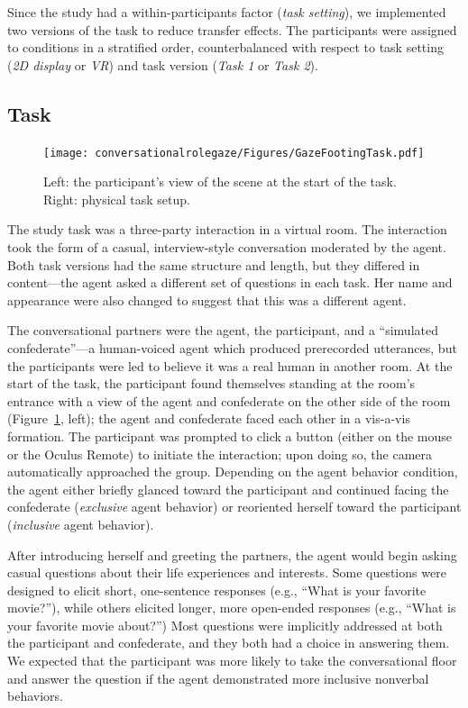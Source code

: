 Since the study had a within-participants factor (\emph{task setting}), we implemented two versions of the task to reduce transfer effects. The participants were assigned to conditions in a stratified order, counterbalanced with respect to task setting (\emph{2D display} or \emph{VR}) and task version (\emph{Task 1} or \emph{Task 2}).

\subsection{Task}

\begin{figure}
\centering
\texttt{[image: conversationalrolegaze/Figures/GazeFootingTask.pdf]}
\caption{Left: the participant's view of the scene at the start of the task. Right: physical task setup.}
\label{fig:GazeFootingTask}
\end{figure}

The study task was a three-party interaction in a virtual room. The interaction took the form of a casual, interview-style conversation moderated by the agent. Both task versions had the same structure and length, but they differed in content---the agent asked a different set of questions in each task. Her name and appearance were also changed to suggest that this was a different agent.

The conversational partners were the agent, the participant, and a ``simulated confederate''---a human-voiced agent which produced prerecorded utterances, but the participants were led to believe it was a real human in another room. At the start of the task, the participant found themselves standing at the room's entrance with a view of the agent and confederate on the other side of the room (Figure~\ref{fig:GazeFootingTask}, left); the agent and confederate faced each other in a vis-a-vis formation. The participant was prompted to click a button (either on the mouse or the Oculus Remote) to initiate the interaction; upon doing so, the camera automatically approached the group. Depending on the agent behavior condition, the agent either briefly glanced toward the participant and continued facing the confederate (\emph{exclusive} agent behavior) or reoriented herself toward the participant (\emph{inclusive} agent behavior).

After introducing herself and greeting the partners, the agent would begin asking casual questions about their life experiences and interests. Some questions were designed to elicit short, one-sentence responses (e.g., ``What is your favorite movie?''), while others elicited longer, more open-ended responses (e.g., ``What is your favorite movie about?'') Most questions were implicitly addressed at both the participant and confederate, and they both had a choice in answering them. We expected that the participant was more likely to take the conversational floor and answer the question if the agent demonstrated more inclusive nonverbal behaviors.

